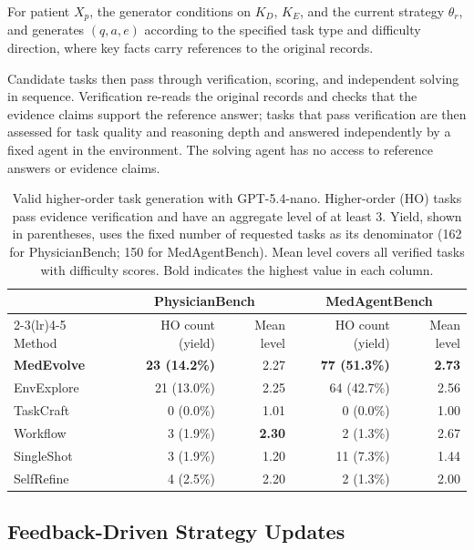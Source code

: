 \documentclass[11pt]{article}
\begin{document}
For patient $X_p$, the generator conditions on $K_D$, $K_E$, and the current strategy $\theta_r$, and generates $(q,a,e)$ according to the specified task type and difficulty direction, where key facts carry references to the original records.

Candidate tasks then pass through verification, scoring, and independent solving in sequence. Verification re-reads the original records and checks that the evidence claims support the reference answer; tasks that pass verification are then assessed for task quality and reasoning depth and answered independently by a fixed agent in the environment. The solving agent has no access to reference answers or evidence claims.

\begin{table}[!t]
\centering
\setlength{\tabcolsep}{7pt}
\renewcommand{\arraystretch}{1.15}
\begin{tabular*}{\textwidth}{@{\extracolsep{\fill}}lrrrr@{}}
\toprule
 & \multicolumn{2}{c}{PhysicianBench} & \multicolumn{2}{c}{MedAgentBench} \\
\cmidrule(lr){2-3}\cmidrule(lr){4-5}
Method & HO count (yield) & Mean level & HO count (yield) & Mean level \\
\midrule
\textbf{MedEvolve} & \textbf{23 (14.2\%)} & 2.27 & \textbf{77 (51.3\%)} & \textbf{2.73} \\
EnvExplore & 21 (13.0\%) & 2.25 & 64 (42.7\%) & 2.56 \\
TaskCraft & 0 (0.0\%) & 1.01 & 0 (0.0\%) & 1.00 \\
Workflow & 3 (1.9\%) & \textbf{2.30} & 2 (1.3\%) & 2.67 \\
SingleShot & 3 (1.9\%) & 1.20 & 11 (7.3\%) & 1.44 \\
SelfRefine & 4 (2.5\%) & 2.20 & 2 (1.3\%) & 2.00 \\
\bottomrule
\end{tabular*}
\caption{Valid higher-order task generation with GPT-5.4-nano. Higher-order (HO) tasks pass evidence verification and have an aggregate level of at least 3. Yield, shown in parentheses, uses the fixed number of requested tasks as its denominator (162 for PhysicianBench; 150 for MedAgentBench). Mean level covers all verified tasks with difficulty scores. Bold indicates the highest value in each column.}
\label{tab:exp1}
\end{table}

\subsection{Feedback-Driven Strategy Updates}
\end{document}

